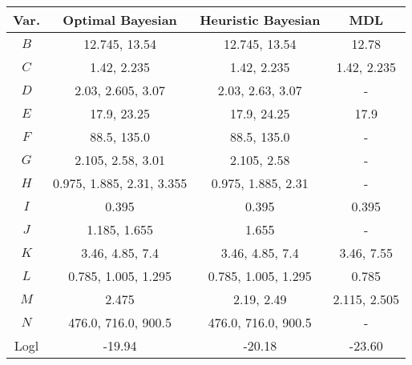 \scriptsize
\begin{tabular}{cccc}
\toprule
Var. & Optimal Bayesian            & Heuristic Bayesian          & MDL          \\
\midrule
$B$    & 12.745, 13.54             & 12.745, 13.54               & 12.78        \\
$C$    & 1.42, 2.235               & 1.42, 2.235                 & 1.42, 2.235  \\
$D$    & 2.03, 2.605, 3.07         & 2.03, 2.63, 3.07            & -            \\
$E$    & 17.9, 23.25               & 17.9, 24.25                 & 17.9         \\
$F$    & 88.5, 135.0               & 88.5, 135.0                 & -            \\
$G$    & 2.105, 2.58, 3.01         & 2.105, 2.58                 & -            \\
$H$    & 0.975, 1.885, 2.31, 3.355 & 0.975, 1.885, 2.31          & -            \\
$I$    & 0.395                     & 0.395                       & 0.395        \\
$J$    & 1.185, 1.655              & 1.655                       & -            \\
$K$    & 3.46, 4.85, 7.4           & 3.46, 4.85, 7.4             & 3.46, 7.55   \\
$L$    & 0.785, 1.005, 1.295       & 0.785, 1.005, 1.295         & 0.785        \\
$M$    & 2.475                     & 2.19, 2.49                  & 2.115, 2.505 \\
$N$    & 476.0, 716.0, 900.5       & 476.0, 716.0, 900.5         & -            \\
\addlinespace[0.5em]
Logl   & -19.94                    & -20.18                      & -23.60        \\
\bottomrule
\end{tabular}